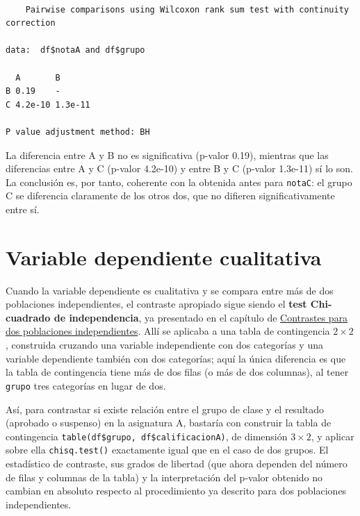\documentclass[
  spanish,
  a4paper,
]{scrreport}
\newenvironment{Shaded}{\begin{snugshade}}{\end{snugshade}}
\newcommand{\AttributeTok}[1]{\textcolor[rgb]{0.40,0.45,0.13}{#1}}
\newcommand{\FunctionTok}[1]{\textcolor[rgb]{0.28,0.35,0.67}{#1}}
\newcommand{\NormalTok}[1]{\textcolor[rgb]{0.00,0.23,0.31}{#1}}
\newcommand{\SpecialCharTok}[1]{\textcolor[rgb]{0.37,0.37,0.37}{#1}}
\newcommand{\StringTok}[1]{\textcolor[rgb]{0.13,0.47,0.30}{#1}}
\theoremstyle{definition}
\theoremstyle{definition}
\theoremstyle{remark}
\begin{document}
\begin{Shaded}
\end{Shaded}

\begin{verbatim}

    Pairwise comparisons using Wilcoxon rank sum test with continuity correction 

data:  df$notaA and df$grupo 

  A       B      
B 0.19    -      
C 4.2e-10 1.3e-11

P value adjustment method: BH 
\end{verbatim}

La diferencia entre A y B no es significativa (p-valor 0.19), mientras
que las diferencias entre A y C (p-valor 4.2e-10) y entre B y C (p-valor
1.3e-11) sí lo son. La conclusión es, por tanto, coherente con la
obtenida antes para \texttt{notaC}: el grupo C se diferencia claramente
de los otros dos, que no difieren significativamente entre sí.

\section{Variable dependiente
cualitativa}\label{variable-dependiente-cualitativa-1}

Cuando la variable dependiente es cualitativa y se compara entre más de
dos poblaciones independientes, el contraste apropiado sigue siendo el
\textbf{test Chi-cuadrado de independencia}, ya presentado en el
capítulo de
\hyperref[contrastes-para-dos-poblaciones-independientes]{Contrastes
para dos poblaciones independientes}. Allí se aplicaba a una tabla de
contingencia \(2\times2\), construida cruzando una variable
independiente con dos categorías y una variable dependiente también con
dos categorías; aquí la única diferencia es que la tabla de contingencia
tiene más de dos filas (o más de dos columnas), al tener \texttt{grupo}
tres categorías en lugar de dos.

Así, para contrastar si existe relación entre el grupo de clase y el
resultado (aprobado o suspenso) en la asignatura A, bastaría con
construir la tabla de contingencia
\texttt{table(df\$grupo,\ df\$calificacionA)}, de dimensión
\(3\times2\), y aplicar sobre ella \texttt{chisq.test()} exactamente
igual que en el caso de dos grupos. El estadístico de contraste, sus
grados de libertad (que ahora dependen del número de filas y columnas de
la tabla) y la interpretación del p-valor obtenido no cambian en
absoluto respecto al procedimiento ya descrito para dos poblaciones
independientes.
\end{document}
